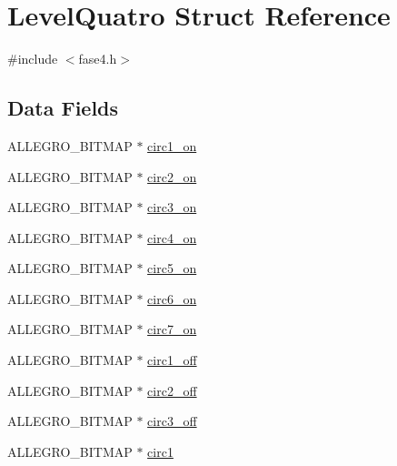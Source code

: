 \hypertarget{struct_level_quatro}{\section{Level\-Quatro Struct Reference}
\label{struct_level_quatro}
}


{\ttfamily \#include $<$fase4.\-h$>$}

\subsection*{Data Fields}
\begin{DoxyCompactItemize}
\item 
A\-L\-L\-E\-G\-R\-O\-\_\-\-B\-I\-T\-M\-A\-P $\ast$ \hyperlink{struct_level_quatro_a15699608afb18fad793848cd8fd32fe0}{circ1\-\_\-on}
\item 
A\-L\-L\-E\-G\-R\-O\-\_\-\-B\-I\-T\-M\-A\-P $\ast$ \hyperlink{struct_level_quatro_aa582b8f9acdbb85a2d1d54705e26fa15}{circ2\-\_\-on}
\item 
A\-L\-L\-E\-G\-R\-O\-\_\-\-B\-I\-T\-M\-A\-P $\ast$ \hyperlink{struct_level_quatro_ad58139cfabe6836662aec8a3293c9208}{circ3\-\_\-on}
\item 
A\-L\-L\-E\-G\-R\-O\-\_\-\-B\-I\-T\-M\-A\-P $\ast$ \hyperlink{struct_level_quatro_ae514d3cf3c3cb83de5ab4682ead1c7f6}{circ4\-\_\-on}
\item 
A\-L\-L\-E\-G\-R\-O\-\_\-\-B\-I\-T\-M\-A\-P $\ast$ \hyperlink{struct_level_quatro_a1537bde5184cc347504f101c712fb0ee}{circ5\-\_\-on}
\item 
A\-L\-L\-E\-G\-R\-O\-\_\-\-B\-I\-T\-M\-A\-P $\ast$ \hyperlink{struct_level_quatro_aa380bab7c5e4a7793500bc4563c4a6bd}{circ6\-\_\-on}
\item 
A\-L\-L\-E\-G\-R\-O\-\_\-\-B\-I\-T\-M\-A\-P $\ast$ \hyperlink{struct_level_quatro_a120b206a58a11edb5fee11d79c1c2aa6}{circ7\-\_\-on}
\item 
A\-L\-L\-E\-G\-R\-O\-\_\-\-B\-I\-T\-M\-A\-P $\ast$ \hyperlink{struct_level_quatro_a61973bafd11ab9dea9306731297f4728}{circ1\-\_\-off}
\item 
A\-L\-L\-E\-G\-R\-O\-\_\-\-B\-I\-T\-M\-A\-P $\ast$ \hyperlink{struct_level_quatro_a384448f3d672f70b70b1bf454cb46e50}{circ2\-\_\-off}
\item 
A\-L\-L\-E\-G\-R\-O\-\_\-\-B\-I\-T\-M\-A\-P $\ast$ \hyperlink{struct_level_quatro_a91273d7098df87dd93c9f9a10b62ed08}{circ3\-\_\-off}
\item 
A\-L\-L\-E\-G\-R\-O\-\_\-\-B\-I\-T\-M\-A\-P $\ast$ \hyperlink{struct_level_quatro_a9877f31790b6d2f38fb468a9448223f1}{circ1}

\end{DoxyCompactItemize}
